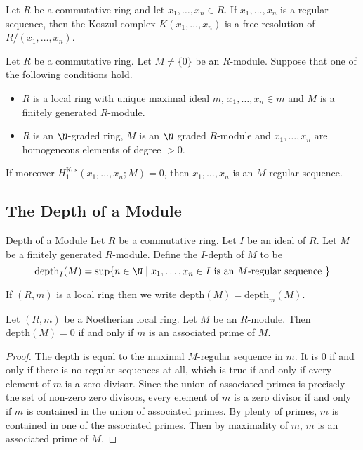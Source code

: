 \documentclass[a4paper]{article}
\begin{document}
\begin{crl}{}{} Let $R$ be a commutative ring and let $x_1,\dots,x_n\in R$. If $x_1,\dots,x_n$ is a regular sequence, then the Koszul complex $K(x_1,\dots,x_n)$ is a free resolution of $R/(x_1,\dots,x_n)$. 
\end{crl}

\begin{prp}{}{} Let $R$ be a commutative ring. Let $M\neq\{0\}$ be an $R$-module. Suppose that one of the following conditions hold. 
\begin{itemize}
\item $R$ is a local ring with unique maximal ideal $m$, $x_1,\dots,x_n\in m$ and $M$ is a finitely generated $R$-module. 
\item $R$ is an $\N$-graded ring, $M$ is an $\N$ graded $R$-module and $x_1,\dots,x_n$ are homogeneous elements of degree $>0$. 
\end{itemize}
If moreover $H_1^\text{Kos}(x_1,\dots,x_n;M)=0$, then $x_1,\dots,x_n$ is an $M$-regular sequence. 
\end{prp}

\subsection{The Depth of a Module}
\begin{defn}{Depth of a Module}{} Let $R$ be a commutative ring. Let $I$ be an ideal of $R$. Let $M$ be a finitely generated $R$-module. Define the $I$-depth of $M$ to be $$\text{depth}_I(M)=\sup\{n\in\N\;|\;x_1,\dots,x_n\in I\text{ is an }M\text{-regular sequence }\}$$
\end{defn}

If $(R,m)$ is a local ring then we write $\text{depth}(M)=\text{depth}_m(M)$. 

\begin{lmm}{}{} Let $(R,m)$ be a Noetherian local ring. Let $M$ be an $R$-module. Then $\text{depth}(M)=0$ if and only if $m$ is an associated prime of $M$. \tcbline
\begin{proof}
The depth is equal to the maximal $M$-regular sequence in $m$. It is $0$ if and only if there is no regular sequences at all, which is true if and only if every element of $m$ is a zero divisor. Since the union of associated primes is precisely the set of non-zero zero divisors, every element of $m$ is a zero divisor if and only if $m$ is contained in the union of associated primes. By plenty of primes, $m$ is contained in one of the associated primes. Then by maximality of $m$, $m$ is an associated prime of $M$. 
\end{proof}
\end{lmm}
\end{document}
